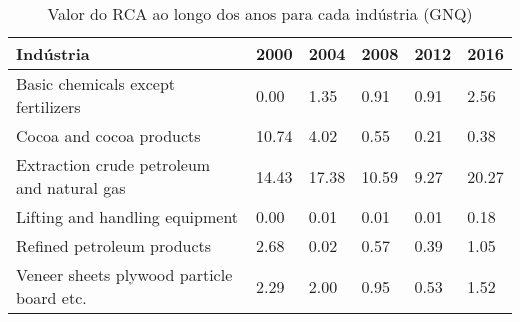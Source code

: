 \begin{table}
\centering
\caption{Valor do RCA ao longo dos anos para cada indústria (GNQ)}
\begin{tabular}{p{6cm}p{1.5cm}p{1.5cm}p{1.5cm}p{1.5cm}p{1.5cm}}
\toprule
                                 Indústria &  2000 &  2004 &  2008 & 2012 &  2016 \\
\midrule
        Basic chemicals except fertilizers &  0.00 &  1.35 &  0.91 & 0.91 &  2.56 \\
                  Cocoa and cocoa products & 10.74 &  4.02 &  0.55 & 0.21 &  0.38 \\
Extraction crude petroleum and natural gas & 14.43 & 17.38 & 10.59 & 9.27 & 20.27 \\
            Lifting and handling equipment &  0.00 &  0.01 &  0.01 & 0.01 &  0.18 \\
                Refined petroleum products &  2.68 &  0.02 &  0.57 & 0.39 &  1.05 \\
 Veneer sheets plywood particle board etc. &  2.29 &  2.00 &  0.95 & 0.53 &  1.52 \\
\bottomrule
\end{tabular}
\end{table}
